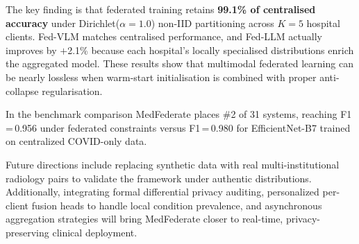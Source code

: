 \documentclass[conference]{IEEEtran}
\begin{document}
The key finding is that federated training retains
\textbf{99.1\% of centralised accuracy} under
Dirichlet($\alpha{=}1.0$) non-IID partitioning across $K{=}5$ hospital
clients. Fed-VLM matches centralised performance, and Fed-LLM actually
improves by $+$2.1\% because each hospital's locally specialised
distributions enrich the aggregated model. These results show that
multimodal federated learning can be nearly lossless when warm-start
initialisation is combined with proper anti-collapse regularisation.

In the benchmark comparison MedFederate places \#2 of 31 systems,
reaching F1\,=\,0.956 under federated constraints versus F1\,=\,0.980
for EfficientNet-B7 trained on centralized COVID-only data.

Future directions include replacing synthetic data with real multi-institutional
radiology pairs to validate the framework under authentic distributions.
Additionally, integrating formal differential privacy auditing, personalized
per-client fusion heads to handle local condition prevalence, and asynchronous
aggregation strategies will bring MedFederate closer to real-time,
privacy-preserving clinical deployment.
\end{document}
